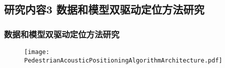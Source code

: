 

\subsection{研究内容3 数据和模型双驱动定位方法研究}

\begin{frame}
	\frametitle{数据和模型双驱动定位方法研究}	
   	\begin{figure}
   	\centering
   	    \texttt{[image: PedestrianAcousticPositioningAlgorithmArchitecture.pdf]}
   	\end{figure} 
\end{frame}

